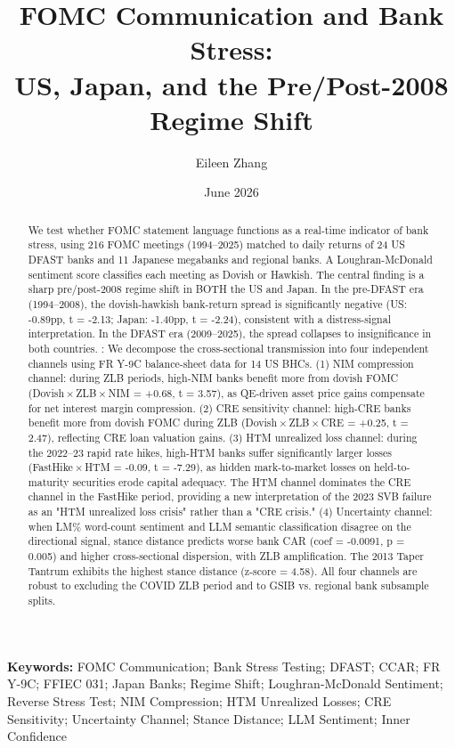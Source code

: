 \documentclass[12pt,a4paper]{article}
\title{\color{primary}\textbf{FOMC Communication and Bank Stress:\\ US, Japan, and the Pre/Post-2008 Regime Shift}}
\author{Eileen Zhang}
\date{June 2026}
\begin{document}
\maketitle

\begin{abstract}
We test whether FOMC statement language functions as a real-time indicator of bank stress, using 216 FOMC meetings (1994–2025) matched to daily returns of 24 US DFAST banks and 11 Japanese megabanks and regional banks. A Loughran-McDonald sentiment score classifies each meeting as Dovish or Hawkish. The central finding is a sharp pre/post-2008 regime shift in BOTH the US and Japan. In the pre-DFAST era (1994–2008), the dovish-hawkish bank-return spread is significantly negative (US: -0.89pp, t = -2.13; Japan: -1.40pp, t = -2.24), consistent with a distress-signal interpretation. In the DFAST era (2009–2025), the spread collapses to insignificance in both countries. : We decompose the cross-sectional transmission into four independent channels using FR Y-9C balance-sheet data for 14 US BHCs. (1) NIM compression channel: during ZLB periods, high-NIM banks benefit more from dovish FOMC (Dovish\,$\times$\,ZLB\,$\times$\,NIM = +0.68, t = 3.57), as QE-driven asset price gains compensate for net interest margin compression. (2) CRE sensitivity channel: high-CRE banks benefit more from dovish FOMC during ZLB (Dovish\,$\times$\,ZLB\,$\times$\,CRE = +0.25, t = 2.47), reflecting CRE loan valuation gains. (3) HTM unrealized loss channel: during the 2022–23 rapid rate hikes, high-HTM banks suffer significantly larger losses (FastHike\,$\times$\,HTM = -0.09, t = -7.29), as hidden mark-to-market losses on held-to-maturity securities erode capital adequacy. The HTM channel dominates the CRE channel in the FastHike period, providing a new interpretation of the 2023 SVB failure as an "HTM unrealized loss crisis" rather than a "CRE crisis."  (4) Uncertainty channel: when LM\% word-count sentiment and LLM semantic classification disagree on the directional signal, stance distance predicts worse bank CAR (coef = -0.0091, p = 0.005) and higher cross-sectional dispersion, with ZLB amplification. The 2013 Taper Tantrum exhibits the highest stance distance (z-score = 4.58). All four channels are robust to excluding the COVID ZLB period and to GSIB vs. regional bank subsample splits.
\end{abstract}

\noindent\textbf{Keywords:} FOMC Communication; Bank Stress Testing; DFAST; CCAR; FR Y-9C; FFIEC 031; Japan Banks; Regime Shift; Loughran-McDonald Sentiment; Reverse Stress Test; NIM Compression; HTM Unrealized Losses; CRE Sensitivity; Uncertainty Channel; Stance Distance; LLM Sentiment; Inner Confidence
\end{document}
